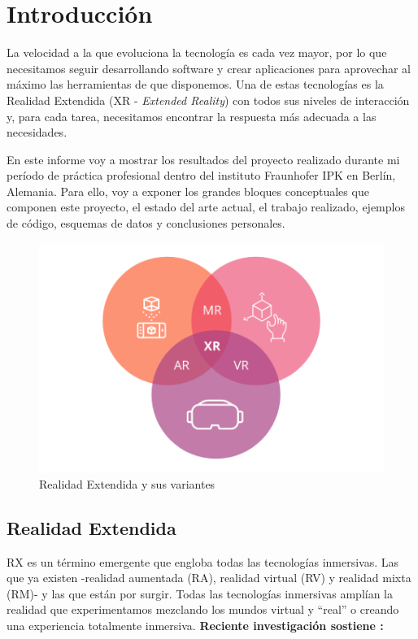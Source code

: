 \chapter*{Introducción}


La velocidad a la que evoluciona la tecnología es cada vez mayor, por lo que necesitamos seguir desarrollando software
y crear aplicaciones para aprovechar al máximo las herramientas de que disponemos. Una de estas tecnologías es la
Realidad Extendida (XR - \textit{Extended Reality}) con todos sus niveles de interacción y, para cada tarea, necesitamos encontrar la respuesta más adecuada a las necesidades.

En este informe voy a mostrar los resultados del proyecto realizado durante mi período de práctica profesional dentro del instituto Fraunhofer IPK en Berlín, Alemania.
Para ello, voy a exponer los grandes bloques conceptuales que componen este proyecto, el estado del arte actual, el trabajo realizado, ejemplos de código, esquemas de datos y conclusiones personales.

\begin{figure}[ht]
    \begin{center}
       \includegraphics[width=0.6\linewidth]{introduction/figures/Extended-Reality.png}
    \end{center}
    \caption[Realidad Extendida y sus variantes]
    {\footnotesize Realidad Extendida y sus variantes}
    \label{fig:mufigure1}
 \end{figure}


\section{Realidad Extendida}

RX es un término emergente que engloba todas las tecnologías inmersivas. Las que ya existen -realidad aumentada (RA), realidad virtual (RV) y realidad mixta (RM)- y las que están por surgir. Todas las tecnologías inmersivas amplían la realidad que experimentamos mezclando los mundos virtual y ``real'' o creando una experiencia totalmente inmersiva.
\textbf{Reciente investigación sostiene : }


